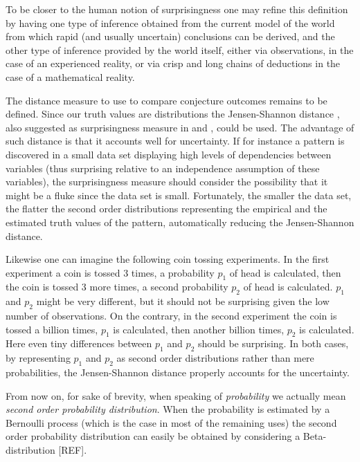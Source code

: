 \documentclass[runningheads]{llncs}
\begin{document}
To be closer to the human notion of surprisingness one may refine this
definition by having one type of inference obtained from the current
model of the world from which rapid (and usually uncertain)
conclusions can be derived, and the other type of inference provided
by the world itself, either via observations, in the case of an
experienced reality, or via crisp and long chains of deductions in the
case of a mathematical reality.

The distance measure to use to compare conjecture outcomes remains to
be defined. Since our truth values are distributions the
Jensen-Shannon distance \cite{Endres2003A}, also suggested as
surprisingness measure in \cite{Pienta2015AN} and
\cite{DerezinskiRH18}, could be used. The advantage of such distance
is that it accounts well for uncertainty. If for instance a pattern is
discovered in a small data set displaying high levels of dependencies
between variables (thus surprising relative to an independence
assumption of these variables), the surprisingness measure should
consider the possibility that it might be a fluke since the data set
is small. Fortunately, the smaller the data set, the flatter the
second order distributions representing the empirical and the
estimated truth values of the pattern, automatically reducing the
Jensen-Shannon distance.

Likewise one can imagine the following coin tossing experiments. In
the first experiment a coin is tossed 3 times, a probability $p_1$ of
head is calculated, then the coin is tossed 3 more times, a second
probability $p_2$ of head is calculated. $p_1$ and $p_2$ might be very
different, but it should not be surprising given the low number of
observations. On the contrary, in the second experiment the coin is
tossed a billion times, $p_1$ is calculated, then another billion
times, $p_2$ is calculated. Here even tiny differences between $p_1$
and $p_2$ should be surprising. In both cases, by representing $p_1$
and $p_2$ as second order distributions rather than mere
probabilities, the Jensen-Shannon distance properly accounts for the
uncertainty.

From now on, for sake of brevity, when speaking of \emph{probability}
we actually mean \emph{second order probability distribution}. When
the probability is estimated by a Bernoulli process (which is the case
in most of the remaining uses) the second order probability
distribution can easily be obtained by considering a Beta-distribution
[REF].
\end{document}
